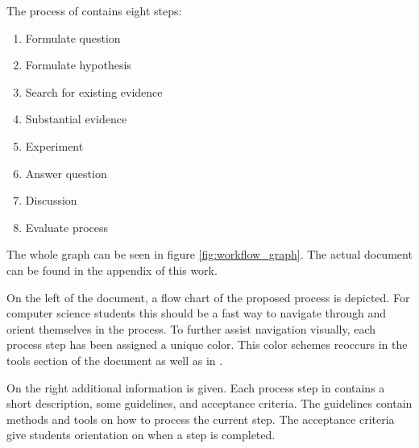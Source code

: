 \begin{minipage}{\linewidth}
The process of \checklist contains eight steps:
\begin{enumerate}
\item Formulate question
\item Formulate hypothesis
\item Search for existing evidence
\item Substantial evidence
\item Experiment
\item Answer question
\item Discussion
\item Evaluate process
\end{enumerate}


The whole graph can be seen in figure \ref{fig:workflow_graph}. The actual document can be found in the appendix of this work.

On the left of the document, a flow chart of the proposed process is depicted. For computer science students this should be a fast way to navigate through and orient themselves in the process. To further assist navigation visually, each process step has been assigned a unique color. This color schemes reoccurs in the tools section of the document as well as in \briefingform.

On the right additional information is given. Each process step in \checklist contains a short description, some guidelines, and acceptance criteria. The guidelines contain methods and tools on how to process the current step. The acceptance criteria give students orientation on when a step is completed.


\end{minipage}









